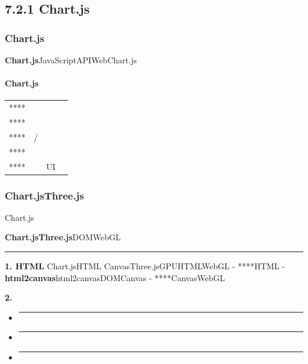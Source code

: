 \subsection{7.2.1 Chart.js}\label{chart.js}

\subsubsection{Chart.js}\label{chart.js-1}

\textbf{Chart.js}JavaScriptAPIWebChart.js

\paragraph{Chart.js}\label{chart.js-2}

\begin{longtable}[]{@{}llll@{}}
\toprule\noalign{}
\endhead
\bottomrule\noalign{}
\endlastfoot
**** & & & \\
**** & & & \\
**** & / & & \\
**** & & & \\
**** & & UI & \\
\end{longtable}

\subsubsection{Chart.jsThree.js}\label{chart.jsthree.js-2}

Chart.js

\textbf{Chart.jsThree.js}DOMWebGL

\begin{center}\rule{0.5\linewidth}{0.5pt}\end{center}

\textbf{1. HTML} Chart.jsHTML CanvasThree.jsGPUHTMLWebGL - ****HTML -
\textbf{html2canvas}html2canvasDOMCanvas - ****CanvasWebGL

\textbf{2. }

\begin{itemize}
\item
  \begin{center}\rule{0.5\linewidth}{0.5pt}\end{center}
\item
  \begin{center}\rule{0.5\linewidth}{0.5pt}\end{center}
\item
  \begin{center}\rule{0.5\linewidth}{0.5pt}\end{center}
\end{itemize}


